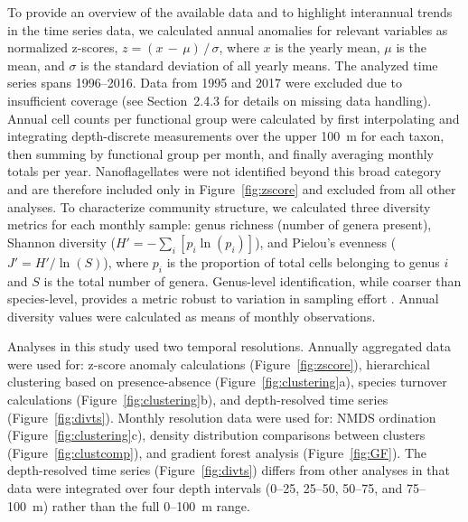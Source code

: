 \documentclass[]{agujournal2019}
\begin{document}
     To provide an overview of the available data and to highlight interannual trends in the time series data, we calculated annual anomalies for relevant variables as normalized z-scores, $z = (x\,-\,\mu)\,/\,\sigma$, where $x$ is the yearly mean, $\mu$ is the mean, and $\sigma$ is the standard deviation of all yearly means. The analyzed time series spans 1996–2016. Data from 1995 and 2017 were excluded due to insufficient coverage (see Section~2.4.3 for details on missing data handling). 
     Annual cell counts per functional group were calculated by first interpolating and integrating depth-discrete measurements over the upper 100~m for each taxon, then summing by functional group per month, and finally averaging monthly totals per year.  Nanoflagellates were not identified beyond this broad category and are therefore included only in Figure~\ref{fig:zscore} and excluded from all other analyses.
    To characterize community structure, we calculated three diversity metrics for each monthly sample: genus richness (number of genera present), Shannon diversity ($H' = -\sum_i [p_i \ln(p_i)]$), and Pielou's evenness ($J' = H'/\ln(S)$), where $p_i$ is the proportion of total cells belonging to genus $i$ and $S$ is the total number of genera. Genus-level identification, while coarser than species-level, provides a metric robust to variation in sampling effort \cite{ptacnik_diversity_2008, de_oliveira_jr_higher_2020}. Annual diversity values were calculated as means of monthly observations.

     Analyses in this study used two temporal resolutions. Annually aggregated data were used for: z-score anomaly calculations (Figure~\ref{fig:zscore}), hierarchical clustering based on presence-absence (Figure~\ref{fig:clustering}a), species turnover calculations (Figure~\ref{fig:clustering}b), and depth-resolved time series (Figure~\ref{fig:divts}). Monthly resolution data were used for: NMDS ordination (Figure~\ref{fig:clustering}c), density distribution comparisons between clusters (Figure~\ref{fig:clustcomp}), and gradient forest analysis (Figure~\ref{fig:GF}). The depth-resolved time series (Figure~\ref{fig:divts}) differs from other analyses in that data were integrated over four depth intervals (0–25, 25–50, 50–75, and 75–100~m) rather than the full 0–100~m range.
      
\end{document}
